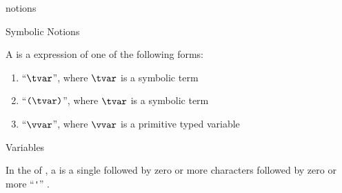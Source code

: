 \documentclass{stex}
\begin{document}
\begin{smodule}{notions}


\ifinputref\else{}\fi

\begin{sfragment}[id=sec:symbolic-notions]{Symbolic Notions}
  \begin{sparagraph}[style=symdoc,for=symbolic notion]
    A  is a \ForTheL expression of one of the following forms:
    \begin{enumerate}
      \item ``$\tvar$'', where $\tvar$ is a symbolic term
      \item ``$\texttt(\tvar\texttt)$'', where $\tvar$ is a symbolic term
      \item ``$\vvar$'', where $\vvar$ is a primitive typed variable
    \end{enumerate}
  \end{sparagraph}
\end{sfragment}

\begin{sfragment}[id=sec:variables]{Variables}
  \begin{sparagraph}[style=symdoc,for=variable]
    In the \asciidialect of \ForTheL, a  is a single  followed by zero or more
     characters followed by zero or more ``\texttt''' .


\end{sparagraph}
\end{sfragment}
\end{smodule}
\end{document}
